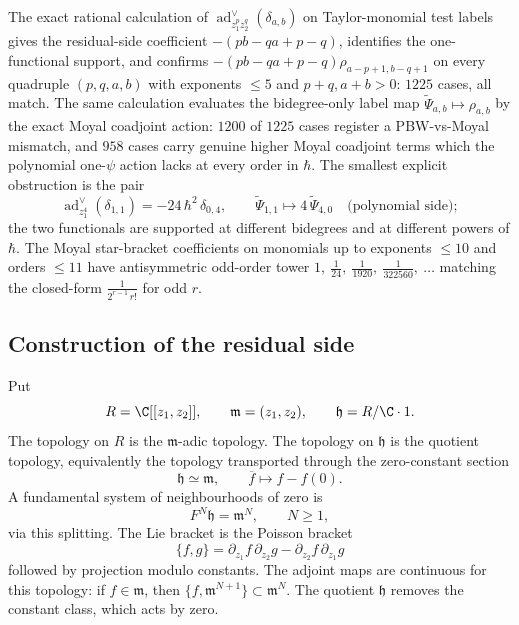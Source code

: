 \begin{rmk}
\label{rmk:app-defect-polarization-numerics}
  The exact rational calculation of
  \(\operatorname{ad}^\vee_{z_1^pz_2^q}(\delta_{a,b})\)
  on Taylor-monomial test labels gives the residual-side coefficient
  \(-(pb-qa+p-q)\), identifies the
  one-functional support, and confirms
  \(-(pb-qa+p-q)\rho_{a-p+1,b-q+1}\) on every quadruple \((p,q,a,b)\)
  with exponents \(\le 5\) and \(p+q,a+b>0\): \(1225\) cases, all match.
  The same calculation evaluates the bidegree-only label map
	  \(\widetilde\Psi_{a,b}\mapsto\rho_{a,b}\) by the exact Moyal coadjoint
	  action: \(1200\) of \(1225\) cases register a PBW-vs-Moyal mismatch,
	  and \(958\) cases carry genuine higher Moyal coadjoint terms which the
	  polynomial one-\(\psi\) action lacks at every order in
  \(\hbar\).  The smallest explicit obstruction is the pair
  \[
    \operatorname{ad}^\vee_{z_1^4}(\delta_{1,1})
      =-24\,\hbar^2\,\delta_{0,4},
    \qquad
    \widetilde\Psi_{1,1}\mapsto4\,\widetilde\Psi_{4,0}
    \quad\text{(polynomial side)};
  \]
  the two functionals are supported at different bidegrees and at
  different powers of \(\hbar\).  The Moyal star-bracket coefficients
  on monomials up to exponents \(\le 10\) and orders \(\le 11\) have
  antisymmetric odd-order tower
  \(1,\ \tfrac1{24},\ \tfrac1{1920},\ \tfrac1{322560},\ \dots\) matching
  the closed-form \(\tfrac{1}{2^{r-1}\,r!}\) for odd \(r\).
\end{rmk}

\subsection{Construction of the residual side}
\label{ssec:app-matlis-construction}

\begin{defn}
\label{def:app-matlis-topology}
  Put
  \[
    R=\C[[z_1,z_2]],\qquad \mathfrak m=(z_1,z_2),\qquad
    \mathfrak h=R/\C\cdot1 .
  \]
  The topology on \(R\) is the \(\mathfrak m\)-adic topology.  The
  topology on \(\mathfrak h\) is the quotient topology, equivalently
  the topology transported through the zero-constant section
  \[
    \mathfrak h\simeq \mathfrak m,\qquad
    \overline f\longmapsto f-f(0).
  \]
  A fundamental system of neighbourhoods of zero is
  \[
    F^N\mathfrak h=\mathfrak m^N,\qquad N\geq1,
  \]
  via this splitting.  The Lie bracket is the Poisson bracket
  \[
    \{f,g\}=\partial_{z_1}f\,\partial_{z_2}g
      -\partial_{z_2}f\,\partial_{z_1}g
  \]
  followed by projection modulo constants.  The adjoint maps are continuous
  for this topology: if \(f\in\mathfrak m\), then
  \(\{f,\mathfrak m^{N+1}\}\subset \mathfrak m^N\).  The quotient
  \(\mathfrak h\) removes the constant class, which acts by zero.
\end{defn}

